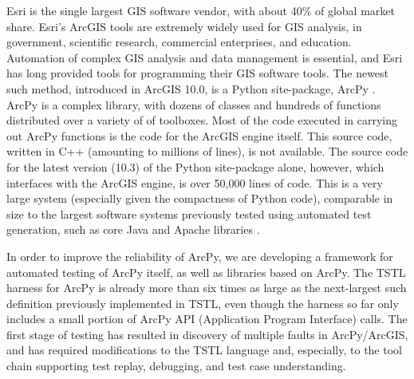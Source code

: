 Esri is the single largest GIS software vendor, with about 40\% of
global market share.  Esri's ArcGIS tools are extremely widely used
for GIS analysis, in government, scientific research, commercial
enterprises, and education.  Automation of complex GIS analysis and
data management is essential, and Esri has long provided tools for
programming their GIS software tools.  The newest such method,
introduced in ArcGIS 10.0, is a Python site-package, ArcPy
\cite{ArcPy}.  ArcPy is a complex library, with dozens of classes and
hundreds of functions distributed over a variety of of toolboxes.
Most of the code executed in carrying out ArcPy functions is the code
for the ArcGIS engine itself.  This source code, written in C++
(amounting to millions of lines), is
not available.  The source code for the latest version (10.3) of the
Python site-package alone, however, which interfaces with the ArcGIS
engine, is over 50,000 lines of code.  This is a very large system
(especially given the compactness of Python code), comparable in size
to the largest software systems previously tested using automated test
generation, such as core Java and Apache libraries
\cite{FA11,Pacheco}.

In order to improve the reliability of ArcPy, we are developing a
framework for automated testing of ArcPy itself, as well as libraries
based on ArcPy.  The TSTL harness for ArcPy is already more than six times as
large as the next-largest such definition previously implemented in
TSTL, even though the harness so far only includes a small portion of ArcPy
API (Application Program Interface) calls. The first stage of testing has resulted in discovery of
multiple faults in ArcPy/ArcGIS, and has required modifications to the
TSTL language and, especially, to the tool chain supporting test replay,
debugging, and test case understanding.




